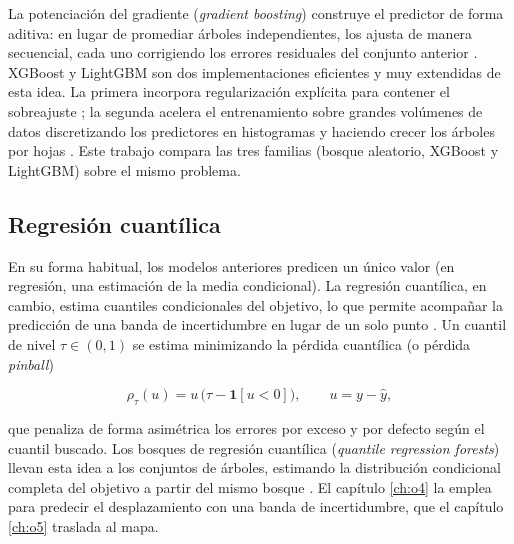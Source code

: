 La potenciación del gradiente (\textit{gradient boosting}) construye el predictor de
forma aditiva: en lugar de promediar árboles independientes, los ajusta de manera
secuencial, cada uno corrigiendo los errores residuales del conjunto anterior
\cite{friedman2001}. XGBoost y LightGBM son dos implementaciones eficientes y muy
extendidas de esta idea. La primera incorpora regularización explícita para contener
el sobreajuste \cite{chen2016}; la segunda acelera el entrenamiento sobre grandes
volúmenes de datos discretizando los predictores en histogramas y haciendo crecer los
árboles por hojas \cite{ke2017}. Este trabajo compara las tres familias (bosque
aleatorio, XGBoost y LightGBM) sobre el mismo problema.

\subsection{Regresión cuantílica}
\label{sec:prelim-cuantil}

En su forma habitual, los modelos anteriores predicen un único valor (en regresión,
una estimación de la media condicional). La regresión cuantílica, en cambio, estima
cuantiles condicionales del objetivo, lo que permite acompañar la predicción de una
banda de incertidumbre en lugar de un solo punto \cite{koenker1978}. Un cuantil de
nivel $\tau \in (0,1)$ se estima minimizando la pérdida cuantílica (o pérdida
\textit{pinball})

\begin{equation}
  \rho_\tau(u) = u \, \bigl(\tau - \mathbf{1}[u < 0]\bigr), \qquad u = y - \hat{y},
  \label{eq:prelim-pinball}
\end{equation}

que penaliza de forma asimétrica los errores por exceso y por defecto según el
cuantil buscado. Los bosques de regresión cuantílica (\textit{quantile regression
forests}) llevan esta idea a los conjuntos de árboles, estimando la distribución
condicional completa del objetivo a partir del mismo bosque \cite{meinshausen2006}.
El capítulo \ref{ch:o4} la emplea para predecir el desplazamiento con una banda de
incertidumbre, que el capítulo \ref{ch:o5} traslada al mapa.
